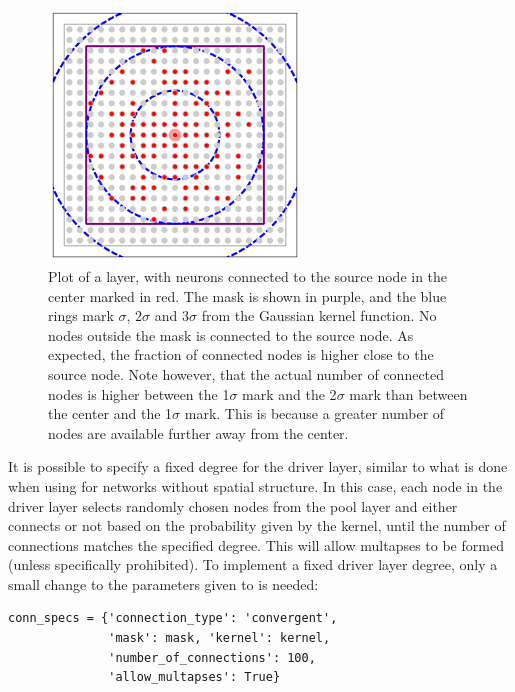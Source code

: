 \begin{figure}[h]
  \centering
  \includegraphics[width=0.6\textwidth]{TopologyExample.pdf}
  \caption[Example of connectivity pattern]{Plot of a layer, with neurons connected to the source node in the center marked in red. The mask is shown in purple, and the blue rings mark $\sigma$, $2 \sigma$ and $3 \sigma$ from the Gaussian kernel function. No nodes outside the mask is connected to the source node. As expected, the fraction of connected nodes is higher close to the source node. Note however, that the actual number of connected nodes is higher between the 1$\sigma$ mark and the 2$\sigma$ mark than between the center and the 1$\sigma$ mark. This is because a greater number of nodes are available further away from the center.}
  \label{fig:topology}
\end{figure} 

It is possible to specify a fixed degree for the driver layer, similar to what is done when using  for networks without spatial structure. In this case, each node in the driver layer selects randomly chosen nodes from the pool layer and either connects or not based on the probability given by the kernel, until the number of connections matches the specified degree. This will allow multapses to be formed (unless specifically prohibited). To implement a fixed driver layer degree, only a small change to the parameters given to  is needed:
\begin{lstlisting}
conn_specs = {'connection_type': 'convergent', 
              'mask': mask, 'kernel': kernel,
              'number_of_connections': 100,
              'allow_multapses': True}
\end{lstlisting}

